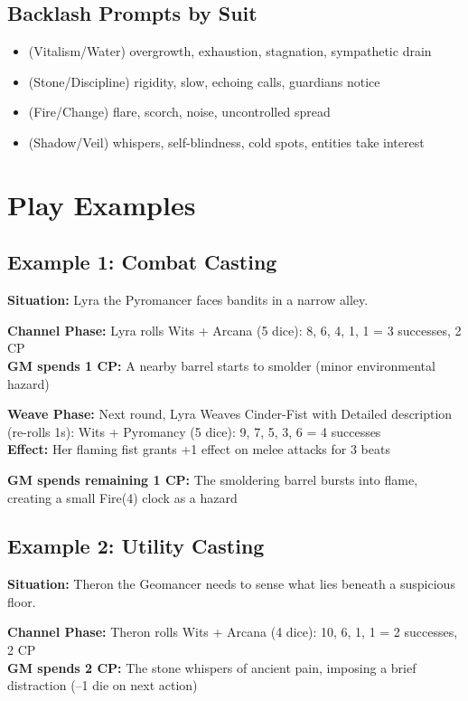 \documentclass[11pt]{report}
\begin{document}
\subsection{Backlash Prompts by Suit}
\begin{itemize}
    \item \heartsuit (Vitalism/Water) overgrowth, exhaustion, stagnation, sympathetic drain
    \item \clubsuit (Stone/Discipline) rigidity, slow, echoing calls, guardians notice
    \item \diamondsuit (Fire/Change) flare, scorch, noise, uncontrolled spread
    \item \spadesuit (Shadow/Veil) whispers, self-blindness, cold spots, entities take interest
\end{itemize}

\section{Play Examples}

\subsection{Example 1: Combat Casting}
\textbf{Situation:} Lyra the Pyromancer faces bandits in a narrow alley.

\textbf{Channel Phase:} Lyra rolls Wits + Arcana (5 dice): 8, 6, 4, 1, 1 = 3 successes, 2 CP\\
\textbf{GM spends 1 CP:} A nearby barrel starts to smolder (minor environmental hazard)

\textbf{Weave Phase:} Next round, Lyra Weaves Cinder-Fist with Detailed description (re-rolls 1s): Wits + Pyromancy (5 dice): 9, 7, 5, 3, 6 = 4 successes\\
\textbf{Effect:} Her flaming fist grants +1 effect on melee attacks for 3 beats

\textbf{GM spends remaining 1 CP:} The smoldering barrel bursts into flame, creating a small Fire(4) clock as a hazard

\subsection{Example 2: Utility Casting}
\textbf{Situation:} Theron the Geomancer needs to sense what lies beneath a suspicious floor.

\textbf{Channel Phase:} Theron rolls Wits + Arcana (4 dice): 10, 6, 1, 1 = 2 successes, 2 CP\\
\textbf{GM spends 2 CP:} The stone whispers of ancient pain, imposing a brief distraction (–1 die on next action)
\end{document}
